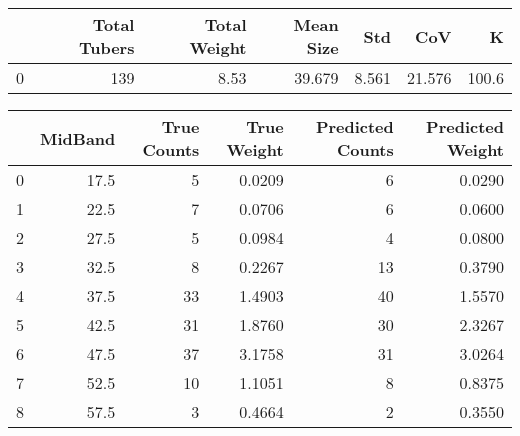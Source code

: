 \begin{tabular}{lrrrrrr}
\toprule
{} &  Total Tubers &  Total Weight &  Mean Size &    Std &     CoV &      K \\
\midrule
0 &           139 &          8.53 &     39.679 &  8.561 &  21.576 &  100.6 \\
\bottomrule
\end{tabular}

\begin{tabular}{lrrrrr}
\toprule
{} &  MidBand &  True Counts &  True Weight &  Predicted Counts &  Predicted Weight \\
\midrule
0 &     17.5 &            5 &       0.0209 &                 6 &            0.0290 \\
1 &     22.5 &            7 &       0.0706 &                 6 &            0.0600 \\
2 &     27.5 &            5 &       0.0984 &                 4 &            0.0800 \\
3 &     32.5 &            8 &       0.2267 &                13 &            0.3790 \\
4 &     37.5 &           33 &       1.4903 &                40 &            1.5570 \\
5 &     42.5 &           31 &       1.8760 &                30 &            2.3267 \\
6 &     47.5 &           37 &       3.1758 &                31 &            3.0264 \\
7 &     52.5 &           10 &       1.1051 &                 8 &            0.8375 \\
8 &     57.5 &            3 &       0.4664 &                 2 &            0.3550 \\
\bottomrule
\end{tabular}

